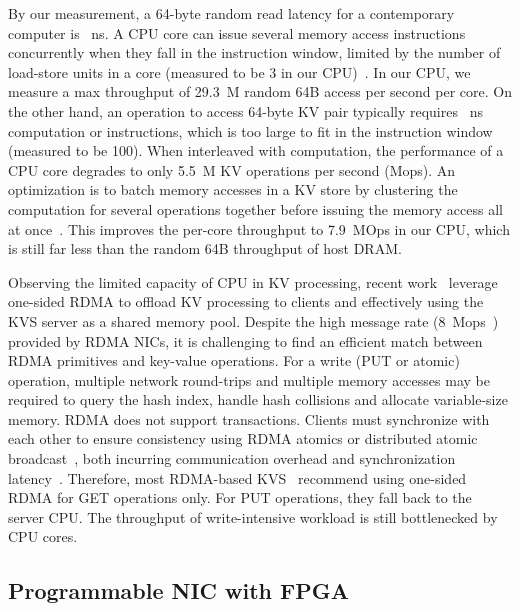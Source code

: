 By our measurement, a 64-byte random read latency for a contemporary computer is ~ns. A CPU core can issue several memory access instructions concurrently when they fall in the instruction window, limited by the number of load-store units in a core (measured to be 3 in our CPU)~\cite{gharachorloo1992hiding, han2010packetshader, zhang2015mega}. In our CPU, we measure a max throughput of 29.3~M random 64B access per second per core. On the other hand, an operation to access 64-byte KV pair typically requires ~ns computation or  instructions, which is too large to fit in the instruction window (measured to be 100). When interleaved with computation, the performance of a CPU core degrades to only 5.5~M KV operations per second (Mops). An optimization is to batch memory accesses in a KV store by clustering the computation for several operations together before issuing the memory access all at once~\cite{li2016full, narula2014phase}. This improves the per-core throughput to 7.9~MOps in our CPU, which is still far less than the random 64B throughput of host DRAM.

Observing the limited capacity of CPU in KV processing, recent work~\cite{mitchell2013using,szepesi2014designing,dragojevic2014farm} leverage one-sided RDMA to offload KV processing to clients and effectively using the KVS server as a shared memory pool.
Despite the high message rate (8~Mops~\cite{kalia2016design}) provided by RDMA NICs, it is challenging to find an efficient match between RDMA primitives and key-value operations.
For a write (PUT or atomic) operation, multiple network round-trips and multiple memory accesses may be required to query the hash index, handle hash collisions and allocate variable-size memory.
RDMA does not support transactions. Clients must synchronize with each other to ensure consistency using RDMA atomics or distributed atomic broadcast~\cite{szepesi2014designing}, both incurring communication overhead and synchronization latency~\cite{mitchell2013using, dragojevic2014farm}.
Therefore, most RDMA-based KVS~\cite{mitchell2013using,dragojevic2014farm,kalia2014using} recommend using one-sided RDMA for GET operations only. For PUT operations, they fall back to the server CPU. The throughput of write-intensive workload is still bottlenecked by CPU cores.

\subsection{Programmable NIC with FPGA}
\label{kvdirect:sec:programmable-nic}

